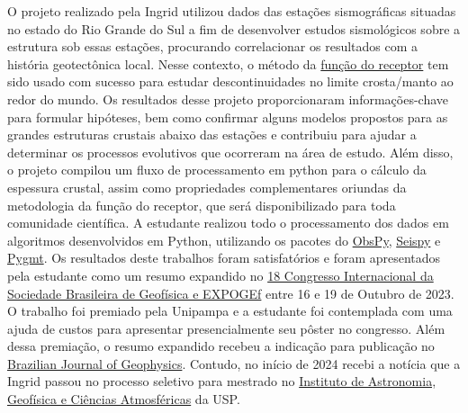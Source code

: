 \documentclass[10pt,a4paper,oneside]{book}
\begin{document}
O projeto realizado pela Ingrid utilizou dados das estações sismográficas situadas no estado do Rio Grande do Sul a fim de desenvolver estudos sismológicos sobre a estrutura sob essas estações, procurando correlacionar os resultados com a história geotectônica local. Nesse contexto, o método da \href{http://eqseis.geosc.psu.edu/cammon/HTML/RftnDocs/rftn01.html#:~:text=Receiver\%20functions\%20are\%20time\%20series,Earth\%20structure\%20near\%20the\%20receiver}{função do receptor} tem sido usado com sucesso para estudar descontinuidades no limite crosta/manto ao redor do mundo. Os resultados desse projeto proporcionaram informações-chave para formular hipóteses, bem como confirmar alguns modelos propostos para as grandes estruturas crustais abaixo das estações e contribuiu para ajudar a determinar os processos evolutivos que ocorreram na área de estudo. Além disso, o projeto compilou um fluxo de processamento em python para o cálculo da espessura crustal, assim como propriedades complementares oriundas da metodologia da função do receptor, que será disponibilizado para toda comunidade científica. A estudante realizou todo o processamento dos dados em algoritmos desenvolvidos em Python, utilizando os pacotes do \href{https://docs.obspy.org/}{ObsPy}, \href{https://seispy.xumijian.me/latest/}{Seispy} e \href{https://www.pygmt.org/latest/}{Pygmt}. Os resultados deste trabalhos foram satisfatórios e foram apresentados pela estudante como um resumo expandido no \href{https://sbgf.org.br/congresso/}{18 Congresso Internacional da Sociedade Brasileira de Geofísica e EXPOGEf} entre 16 e 19 de Outubro de 2023. O trabalho foi premiado pela Unipampa e a estudante foi contemplada com uma ajuda de custos para apresentar presencialmente seu pôster no congresso. Além dessa premiação, o resumo expandido recebeu a indicação para publicação no \href{https://sbgf.org.br/revista/index.php/rbgf}{Brazilian Journal of Geophysics}. Contudo, no início de 2024 recebi a notícia que a Ingrid passou no processo seletivo para mestrado no \href{https://www.iag.usp.br/}{Instituto de Astronomia, Geofísica e Ciências Atmosféricas} da USP.
\end{document}
